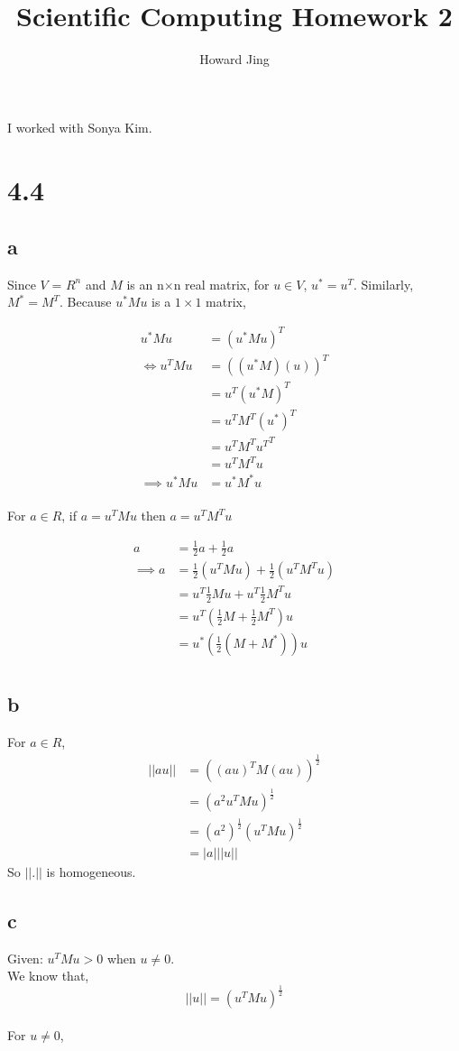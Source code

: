\documentclass[11pt]{amsart}
\title{Scientific Computing Homework 2}
\author{Howard Jing}
\begin{document}
\maketitle
I worked with Sonya Kim.
\section*{4.4}

\subsection*{a}
Since $V$ = $R^n$ and $M$ is an n$\times$n real matrix, for $u \in V$, $u^* = u^T$. Similarly, $M^* = M^T$. Because $u^*Mu$ is a $1\times1$ matrix,

\begin{align*}
u^*Mu &= (u^*Mu)^T\\
\iff u^TMu &= ((u^*M)(u))^T\\ &= u^T(u^*M)^T\\ &= u^TM^T(u^*)^T\\ &=u^TM^T{u^T}^T\\ &=u^TM^Tu\\
\implies u^*Mu &= u^*M^*u
\end{align*}
\\For $a \in R$, if $a= u^TMu$ then $a = u^TM^Tu$

\begin{align*}
a &= \frac{1}{2}a + \frac{1}{2}a\\
\implies a &= \frac{1}{2}(u^TMu) + \frac{1}{2}(u^TM^Tu)\\
&= u^T\frac{1}{2}Mu + u^T\frac{1}{2}M^Tu\\
& = u^T(\frac{1}{2}M + \frac{1}{2}M^T)u\\ 
&= u^*(\frac{1}{2}(M+M^*))u\\
\end{align*}

\subsection*{b}
For $a \in R$,
\begin{align*}
||au|| &= ((au)^TM(au))^\frac{1}{2}\\
&= (a^2 u^TMu)^\frac{1}{2}\\
&= (a^2)^\frac{1}{2}(u^TMu)^\frac{1}{2}\\
&= |a|||u||
\end{align*}
So $||.||$ is homogeneous.

\subsection*{c}
Given: $u^TMu > 0$ when $u\neq 0$.
\\We know that,
\[
||u|| = (u^TMu)^\frac{1}{2}
\]
\\For $u \neq 0$, 
\end{document}

